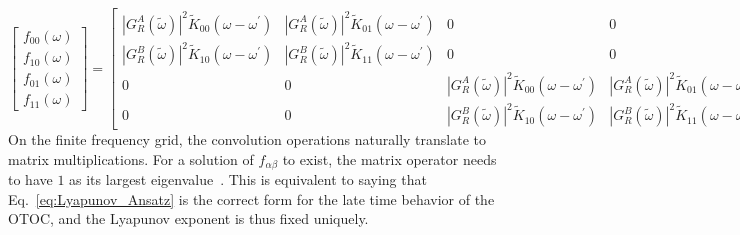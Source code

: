	\begin{equation}
		\begin{bmatrix}
			f_{00}(\omega)\\
			f_{10}(\omega)\\
			f_{01}(\omega)\\
			f_{11}(\omega)
		\end{bmatrix}=\begin{bmatrix}
			|G_{R}^{A}(\tilde{\omega})|^{2}\tilde{K}_{00}(\omega-\omega^{\prime}) & |G_{R}^{A}(\tilde{\omega})|^{2}\tilde{K}_{01}(\omega-\omega^{\prime}) & 0 & 0 \\
			|G_{R}^{B}(\tilde{\omega})|^{2}\tilde{K}_{10}(\omega-\omega^{\prime}) & |G_{R}^{B}(\tilde{\omega})|^{2}\tilde{K}_{11}(\omega-\omega^{\prime}) & 0 & 0 \\
			0 & 0 &
			|G_{R}^{A}(\tilde{\omega})|^{2}\tilde{K}_{00}(\omega-\omega^{\prime}) & |G_{R}^{A}(\tilde{\omega})|^{2}\tilde{K}_{01}(\omega-\omega^{\prime})\\
			0 & 0 &
			|G_{R}^{B}(\tilde{\omega})|^{2}\tilde{K}_{10}(\omega-\omega^{\prime}) & |G_{R}^{B}(\tilde{\omega})|^{2}\tilde{K}_{11}(\omega-\omega^{\prime})
		\end{bmatrix}\begin{bmatrix}f_{00}(\omega^{\prime})\\
			f_{10}(\omega^{\prime})\\
			f_{01}(\omega^{\prime})\\
			f_{11}(\omega^{\prime})
		\end{bmatrix}\;.
	\end{equation}
%
On the finite frequency grid, the convolution operations naturally translate to matrix multiplications.
For a solution of $f_{\alpha\beta}$ to exist, the matrix operator needs to have $1$ as its largest eigenvalue~\cite{stanford_many-body_2016,maldacena_comments_2016,gu2019relation}.
This is equivalent to saying that Eq.~\eqref{eq:Lyapunov_Ansatz} is the correct form for the late time behavior of the OTOC,
and the Lyapunov exponent is thus fixed uniquely. 
%
